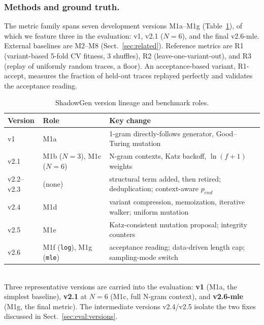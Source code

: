 \documentclass[runningheads]{llncs}
\newcommand{\pend}{\ensuremath{p_{\mathit{end}}}}
\begin{document}
\subsubsection{Methods and ground truth.}
The metric family spans seven development versions M1a--M1g (Table~\ref{tab:versions}), of which we feature three in the evaluation: v1, v2.1 ($N{=}6$), and the final v2.6-mle. External baselines are M2--M8 (Sect.~\ref{sec:related}). Reference metrics are R1 (variant-based 5-fold CV fitness, 3 shuffles), R2 (leave-one-variant-out), and R3 (replay of uniformly random traces, a floor). An acceptance-based variant, R1-accept, measures the fraction of held-out traces replayed perfectly and validates the acceptance reading.

\begin{table}[t]
\centering
\caption{ShadowGen version lineage and benchmark roles.}
\label{tab:versions}
\setlength{\tabcolsep}{4pt}
\footnotesize
\begin{tabular}{@{}llp{5.8cm}@{}}
\toprule
Version & Role & Key change \\
\midrule
v1 & M1a & 1-gram directly-follows generator, Good--Turing mutation \\
v2.1 & M1b ($N{=}3$), M1c ($N{=}6$) & N-gram contexts, Katz backoff, $\ln(f{+}1)$ weights \\
v2.2--v2.3 & (none) & structural term added, then retired; deduplication; context-aware $\pend$ \\
v2.4 & M1d & variant compression, memoization, iterative walker; uniform mutation \\
v2.5 & M1e & Katz-consistent mutation proposal; integrity counters \\
v2.6 & M1f (\texttt{log}), M1g (\texttt{mle}) & acceptance reading; data-driven length cap; sampling-mode switch \\
\bottomrule
\end{tabular}
\\[3pt]
{\footnotesize Three representative versions are carried into the evaluation: \textbf{v1} (M1a, the simplest baseline), \textbf{v2.1} at $N{=}6$ (M1c, full N-gram context), and \textbf{v2.6-mle} (M1g, the final metric). The intermediate versions v2.4/v2.5 isolate the two fixes discussed in Sect.~\ref{sec:eval:versions}.}
\end{table}
\end{document}

